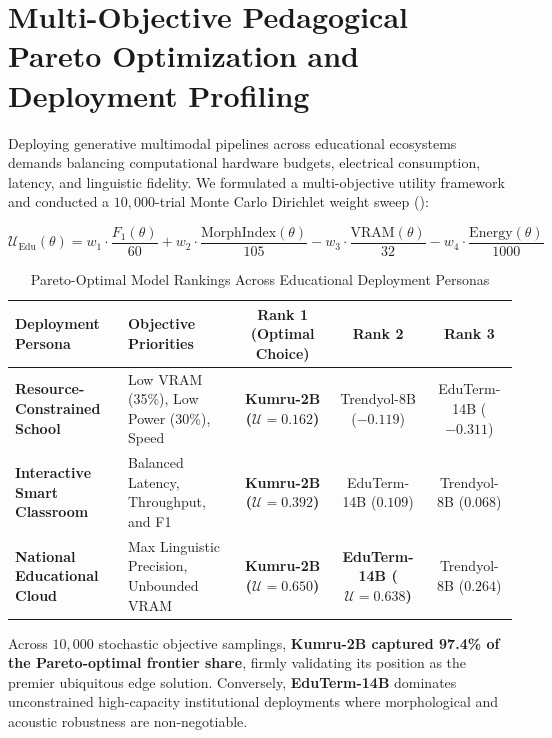 \documentclass[a4paper,12pt]{report}
\begin{document}
\section{Multi-Objective Pedagogical Pareto Optimization and Deployment Profiling}
\label{sec:pareto_optimization_benchmark}
Deploying generative multimodal pipelines across educational ecosystems demands balancing computational hardware budgets, electrical consumption, latency, and linguistic fidelity. We formulated a multi-objective utility framework and conducted a $10{,}000$-trial Monte Carlo Dirichlet weight sweep ():

\begin{equation}
\mathcal{U}_{\text{Edu}}(\theta) = w_1 \cdot \frac{F_1(\theta)}{60} + w_2 \cdot \frac{\text{MorphIndex}(\theta)}{105} - w_3 \cdot \frac{\text{VRAM}(\theta)}{32} - w_4 \cdot \frac{\text{Energy}(\theta)}{1000}
\end{equation}

\begin{table}[htbp]
\centering
\small
\caption{Pareto-Optimal Model Rankings Across Educational Deployment Personas}
\label{tab:pareto_optimization_benchmark}
\scriptsize\setlength{\tabcolsep}{2pt}
\begin{tabularx}{\textwidth}{>{\RaggedRight\arraybackslash}X>{\RaggedRight\arraybackslash}Xccc}
\hline
\textbf{Deployment Persona} & \textbf{Objective Priorities} & \textbf{Rank 1 (Optimal Choice)} & \textbf{Rank 2} & \textbf{Rank 3} \\
\hline
\textbf{Resource-Constrained School} & Low VRAM (35\%), Low Power (30\%), Speed & \textbf{Kumru-2B ($\mathcal{U} = 0.162$)} & Trendyol-8B ($-0.119$) & EduTerm-14B ($-0.311$) \\
\textbf{Interactive Smart Classroom} & Balanced Latency, Throughput, and F1 & \textbf{Kumru-2B ($\mathcal{U} = 0.392$)} & EduTerm-14B ($0.109$) & Trendyol-8B ($0.068$) \\
\textbf{National Educational Cloud} & Max Linguistic Precision, Unbounded VRAM & \textbf{Kumru-2B ($\mathcal{U} = 0.650$)} & \textbf{EduTerm-14B ($\mathcal{U} = 0.638$)} & Trendyol-8B ($0.264$) \\
\hline
\end{tabularx}
\end{table}

Across $10{,}000$ stochastic objective samplings, \textbf{Kumru-2B captured 97.4\% of the Pareto-optimal frontier share}, firmly validating its position as the premier ubiquitous edge solution. Conversely, \textbf{EduTerm-14B} dominates unconstrained high-capacity institutional deployments where morphological and acoustic robustness are non-negotiable.
\end{document}
